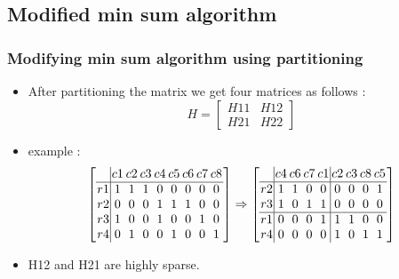 \documentclass[xcolor=dvipsname]
{beamer}
\begin{document}
\subsection{Modified min sum algorithm}
\begin{frame}[t]
\pause
\frametitle{Modifying min sum algorithm using partitioning }  
\begin{itemize}
\item After partitioning the matrix we get four matrices as follows 	:
\[
H = \left[ \begin{array}{c|c}  
H11  & H12     \\ \hline
H21  & H22     \end{array} \right] 
\] 
\item example :
\[
\begingroup %
\setlength\arraycolsep{1pt}
\left[ \begin{array} {c|cccccccc} 
  &    c1 &   c2 &   c3 &  c4  &  c5  &  c6  &  c7  &  c8 \\ \hline
r1 &    1  &   1  &   1  &   0  &   0  &   0  &   0  &   0 \\
r2 &    0  &   0  &   0  &   1  &   1  &   1  &   0  &   0 \\ 
r3 &    1  &   0  &   0  &   1  &   0  &   0  &   1  &   0 \\
r4 &    0  &   1  &   0  &   0  &   1  &   0  &   0  &   1 \end{array} \right] 
     \Rightarrow
\left[ \begin{array} {c|cccc|cccc} 
  &    c4 &   c6 &   c7 &  c1  &  c2  &  c3  &  c8  &  c5 \\ \hline  
r2 &     1  &   1  &   0  &   0  &   0  &   0  &   0  &   1 \\
r3 &     1  &   0  &   1  &   1  &   0  &   0  &   0  &   0 \\ \hline
r1 &     0  &   0  &   0  &   1  &   1  &   1  &   0  &   0 \\
r4 &     0  &   0  &   0  &   0  &   1  &   0  &   1  &   1 \end{array} \right] 
\endgroup
\]
\item H12 and H21 are highly sparse.
\end{itemize}
\end{frame}
\end{document}
